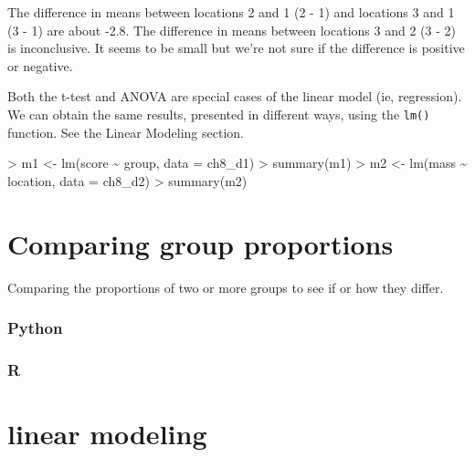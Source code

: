 \documentclass[
]{book}
\newenvironment{Shaded}{\begin{snugshade}}{\end{snugshade}}
\newcommand{\AttributeTok}[1]{\textcolor[rgb]{0.77,0.63,0.00}{#1}}
\newcommand{\FunctionTok}[1]{\textcolor[rgb]{0.00,0.00,0.00}{#1}}
\newcommand{\NormalTok}[1]{#1}
\newcommand{\OtherTok}[1]{\textcolor[rgb]{0.56,0.35,0.01}{#1}}
\newcommand{\SpecialCharTok}[1]{\textcolor[rgb]{0.00,0.00,0.00}{#1}}
\begin{document}
The difference in means between locations 2 and 1 (2 - 1) and locations 3 and 1 (3 - 1) are about -2.8. The difference in means between locations 3 and 2 (3 - 2) is inconclusive. It seems to be small but we're not sure if the difference is positive or negative.

Both the t-test and ANOVA are special cases of the linear model (ie, regression). We can obtain the same results, presented in different ways, using the \texttt{lm()} function. See the Linear Modeling section.

\begin{Shaded}
\begin{Highlighting}[]
\SpecialCharTok{\textgreater{}}\NormalTok{ m1 }\OtherTok{\textless{}{-}} \FunctionTok{lm}\NormalTok{(score }\SpecialCharTok{\textasciitilde{}}\NormalTok{ group, }\AttributeTok{data =}\NormalTok{ ch8\_d1)}
\SpecialCharTok{\textgreater{}} \FunctionTok{summary}\NormalTok{(m1)}
\SpecialCharTok{\textgreater{}}\NormalTok{ m2 }\OtherTok{\textless{}{-}} \FunctionTok{lm}\NormalTok{(mass }\SpecialCharTok{\textasciitilde{}}\NormalTok{ location, }\AttributeTok{data =}\NormalTok{ ch8\_d2)}
\SpecialCharTok{\textgreater{}} \FunctionTok{summary}\NormalTok{(m2)}
\end{Highlighting}
\end{Shaded}

\hypertarget{comparing-group-proportions}{%
\section{Comparing group proportions}\label{comparing-group-proportions}}

Comparing the proportions of two or more groups to see if or how they differ.

\hypertarget{python-46}{%
\subsubsection*{Python}\label{python-46}}

\hypertarget{r-46}{%
\subsubsection*{R}\label{r-46}}

\hypertarget{linear-modeling}{%
\section{linear modeling}\label{linear-modeling}}
\end{document}
